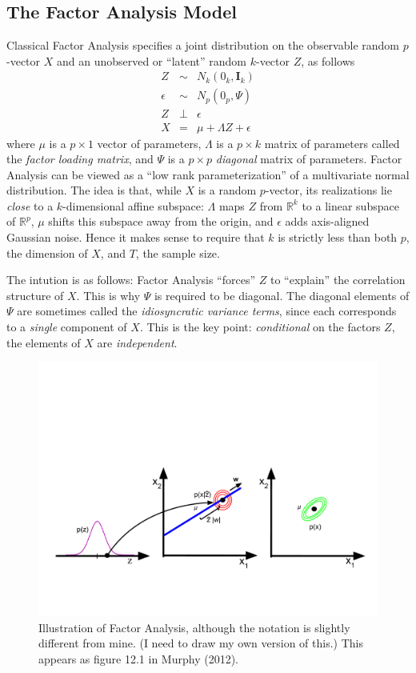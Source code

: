 \documentclass[12pt]{article}
\theoremstyle{definition}
\begin{document}
\subsection{The Factor Analysis Model}
Classical Factor Analysis specifies a joint distribution on the observable random $p$-vector $X$ and an unobserved or ``latent'' random $k$-vector $Z$, as follows
	\begin{eqnarray*}
		Z &\sim& N_k(0_k, \mathbf{I}_k)\\
		\epsilon &\sim& N_p(0_p, \Psi)\\
		Z &\perp& \epsilon\\
		X &=& \mu + \Lambda Z + \epsilon
	\end{eqnarray*}
where $\mu$ is a $p\times 1$ vector of parameters, $\Lambda$ is a $p\times k$ matrix of parameters called the \emph{factor loading matrix}, and $\Psi$ is a $p\times p$ \emph{diagonal} matrix of parameters. Factor Analysis can be viewed as a ``low rank parameterization'' of a multivariate normal distribution. The idea is that, while $X$ is a random $p$-vector, its realizations lie \emph{close} to a $k$-dimensional affine subspace: $\Lambda$ maps $Z$ from $\mathbb{R}^k$ to a linear subspace of $\mathbb{R}^p$, $\mu$ shifts this subspace away from the origin, and $\epsilon$ adds axis-aligned Gaussian noise. Hence it makes sense to require that $k$ is strictly less than both $p$, the dimension of $X$, and $T$, the sample size. 

The intution is as follows: Factor Analysis ``forces'' $Z$ to ``explain'' the correlation structure of $X$. This is why $\Psi$ is required to be diagonal. The diagonal elements of $\Psi$ are sometimes called the \emph{idiosyncratic variance terms}, since each corresponds to a \emph{single} component of $X$. This is the key point: \emph{conditional} on the factors $Z$, the elements of $X$ are \emph{independent}. 
\begin{figure}
	\includegraphics[scale=0.5]{factor_analysis}
	\caption{Illustration of Factor Analysis, although the notation is slightly different from mine. (I need to draw my own version of this.) This appears as figure 12.1 in Murphy (2012).}
\end{figure}
\end{document}
